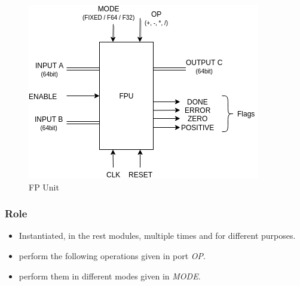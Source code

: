 \documentclass[12pt]{report}
\begin{document}
\begin{center}
    \begin{figure}[hp]
        \centering
        \includegraphics[width=\textwidth]{FPU}
        \caption{FP Unit}
        \label{fig:fpu}
    \end{figure}
\end{center}

\subsubsection{Role}
\begin{itemize}
    \item Instantiated, in the rest modules, multiple times and for different purposes.
    \item perform the following operations given in port \emph{OP}.
    \item perform them in different modes given in \emph{MODE}.
\end{itemize}
\end{document}

